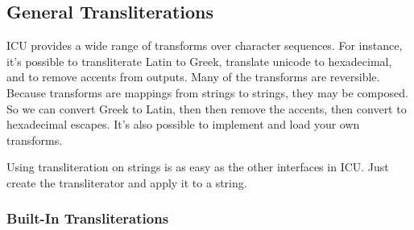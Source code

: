 \subsection{General Transliterations}\label{section:char-unicode-transliterate}

ICU provides a wide range of transforms over character sequences.  For
instance, it's possible to transliterate Latin to Greek, translate
unicode to hexadecimal, and to remove accents from outputs.  Many of
the transforms are reversible.  Because transforms are mappings from
strings to strings, they may be composed.  So we can convert Greek to
Latin, then then remove the accents, then convert to hexadecimal
escapes.  It's also possible to implement and load your own transforms.

Using transliteration on strings is as easy as the other interfaces in
ICU.  Just create the transliterator and apply it to a string.  

\subsubsection{Built-In Transliterations}

